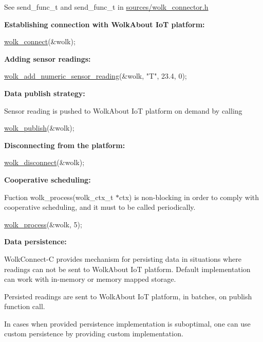 See {\ttfamily send\+\_\+func\+\_\+t} and {\ttfamily send\+\_\+func\+\_\+t} in {\ttfamily \hyperlink{wolk__connector_8h}{sources/wolk\+\_\+connector.\+h}}

{\bfseries Establishing connection with Wolk\+About IoT platform\+:} 
\begin{DoxyCode}
\hyperlink{wolk__connector_8h_ab246fad03ad57f3efe89f4ec2c93a288}{wolk\_connect}(&wolk);
\end{DoxyCode}
 {\bfseries Adding sensor readings\+:} 
\begin{DoxyCode}
\hyperlink{wolk__connector_8h_ab7bcc53c7c06a6cc2b8db5190b1af70f}{wolk\_add\_numeric\_sensor\_reading}(&wolk, \textcolor{stringliteral}{"T"}, 23.4, 0);
\end{DoxyCode}
 {\bfseries Data publish strategy\+:}

Sensor reading is pushed to Wolk\+About IoT platform on demand by calling 
\begin{DoxyCode}
\hyperlink{wolk__connector_8h_ac5e7ddb346ea4b9a7cc4511d3728be09}{wolk\_publish}(&wolk);
\end{DoxyCode}


{\bfseries Disconnecting from the platform\+:} 
\begin{DoxyCode}
\hyperlink{wolk__connector_8h_af174943365b8cddc1e6e9351996805c3}{wolk\_disconnect}(&wolk);
\end{DoxyCode}


{\bfseries Cooperative scheduling\+:}

Fuction {\ttfamily wolk\+\_\+process(wolk\+\_\+ctx\+\_\+t $\ast$ctx)} is non-\/blocking in order to comply with cooperative scheduling, and it must to be called periodically.


\begin{DoxyCode}
\hyperlink{wolk__connector_8h_a57a05d76cc96bc5de0ee0e9a23ca5a8e}{wolk\_process}(&wolk, 5);
\end{DoxyCode}


{\bfseries Data persistence\+:}

Wolk\+Connect-\/C provides mechanism for persisting data in situations where readings can not be sent to Wolk\+About IoT platform. Default implementation can work with in-\/memory or memory mapped storage.

Persisted readings are sent to Wolk\+About IoT platform, in batches, on publish function call.

In cases when provided persistence implementation is suboptimal, one can use custom persistence by providing custom implementation.


